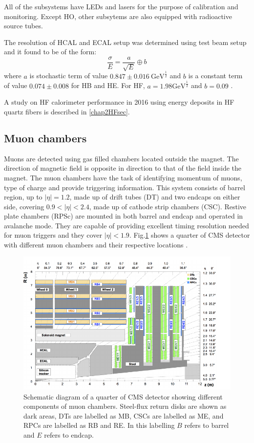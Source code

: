 All of the subsystems have LEDs and lasers for the purpose of calibration and monitoring. Except HO, other subsytems are also equipped 
with radioactive source tubes.

The resolution of HCAL and ECAL setup was determined using test beam setup and it found to be of the form:
\begin{equation}
\frac{\sigma}{E} = \frac{a}{\sqrt{E}} \oplus b
\end{equation}
where $a$ is stochastic term of value $0.847\pm 0.016\ {\mathrm{GeV}}^{\frac{1}{2}}$ and $b$ is a constant term of value $0.074\pm0.008$ 
for HB and HE. For HF, $a = 1.98 {\mathrm{GeV}}^{\frac{1}{2}}$ and $b = 0.09$ \cite{Collaboration_2010}.

A study on HF calorimeter performance in 2016 using energy deposits in HF quartz fibers is described in \ref{chap2HFsec}.

\subsection{Muon chambers}
Muons are detected using gas filled chambers located outside the magnet. The direction of magnetic field is opposite in direction to 
that of the field inside the magnet. The muon chambers have the task of identifying momentum of muons, type of charge and provide 
triggering information. This system consists of barrel region, up to $|\eta| = 1.2$, made up of drift tubes (DT) and two endcaps on either 
side, covering $0.9 < |\eta| < 2.4$, made up of cathode strip chambers (CSC). Restive plate chambers (RPSc) are mounted in both barrel and 
endcap and operated in avalanche mode. They are capable of providing excellent timing resolution needed for muon triggers and they cover 
$|\eta| < 1.9$. Fig.\ref{fig:Muon_chambers} shows a quarter of CMS detector with different muon chambers and their respective locations 
\cite{Sirunyan:2018fpa}.
\begin{figure}[h!]
\centering
\includegraphics[width=0.95\linewidth]{../Figures/Chap2/Muon_chambers}
\captionsetup{width=.95\linewidth}
\caption[Muon chambers]{Schematic diagram of a quarter of CMS detector showing different components of muon chambers. Steel-flux return disks are shown as dark areas, DTs are labelled as MB, CSCs are labelled as ME, and RPCs are labelled as RB and RE. In this labelling $B$ refers to barrel and $E$ refers to endcap.}
\label{fig:Muon_chambers}
\end{figure}

